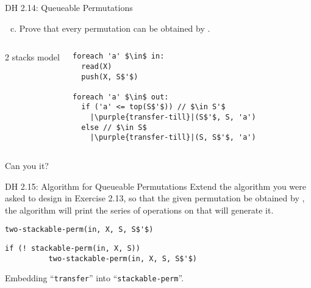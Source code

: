 \begin{frame}[fragile]{}
  \begin{exampleblock}{DH 2.14: Queueable Permutations}
    \begin{enumerate}[(a)]
      \setcounter{enumi}{2}
      \item Prove that every permutation can be obtained by .
    \end{enumerate}
  \end{exampleblock}

  \vspace{0.30cm}
  \begin{columns}
      2 stacks model
    \pause
      \begin{lstlisting}[style = Cstyle]
foreach 'a' $\in$ in:
  read(X)
  push(X, S$'$)

foreach 'a' $\in$ out:
  if ('a' <= top(S$'$)) // $\in S'$
    |\purple{transfer-till}|(S$'$, S, 'a')
  else // $\in S$
    |\purple{transfer-till}|(S, S$'$, 'a')
      \end{lstlisting}
  \end{columns}

  \pause
  \vspace{0.30cm}
  \centerline{\Large Can you  it?}
\end{frame}

\begin{frame}[fragile]{}
  \begin{exampleblock}{DH 2.15: Algorithm for Queueable Permutations}
    Extend the algorithm you were asked to design in Exercise 2.13,
    so that  the given permutation  be obtained by ,
    the algorithm will print the series of operations on  that will generate it.
  \end{exampleblock}

  \pause

  \pause
  \begin{lstlisting}[style = Cstyle]
        two-stackable-perm(in, X, S, S$'$)
  \end{lstlisting}

  \pause
  \begin{lstlisting}[style = Cstyle]
        if (! stackable-perm(in, X, S))
          two-stackable-perm(in, X, S, S$'$)
  \end{lstlisting}

  \pause
  \centerline{\large Embedding ``\texttt{transfer}'' into ``\texttt{stackable-perm}''.}
\end{frame}

